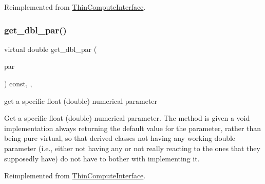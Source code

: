 Reimplemented from \mbox{\hyperlink{class_s_m_spp__di__unipi__it_1_1_thin_compute_interface_adaa8da125823294995410c022a59a4b5}{Thin\+Compute\+Interface}}.

\mbox{\label{class_s_m_spp__di__unipi__it_1_1_f_real_objective_af7101b9f3e872b6ad9129ab99cff4cb7}} 
\subsubsection{\texorpdfstring{get\+\_\+dbl\+\_\+par()}{get\_dbl\_par()}}
{\footnotesize\ttfamily virtual double get\+\_\+dbl\+\_\+par (\begin{DoxyParamCaption}\item[{const \mbox{\hyperlink{class_s_m_spp__di__unipi__it_1_1_thin_compute_interface_aa3d710629ad8c434286726ad810c3b47}{idx\+\_\+type}}}]{par }\end{DoxyParamCaption}) const\hspace{0.3cm}{\ttfamily [inline]}, {\ttfamily [override]}, {\ttfamily [virtual]}}



get a specific float (double) numerical parameter 

Get a specific float (double) numerical parameter. The method is given a void implementation always returning the default value for the parameter, rather than being pure virtual, so that derived classes not having any working double parameter (i.\+e., either not having any or not really reacting to the ones that they supposedly have) do not have to bother with implementing it. 

Reimplemented from \mbox{\hyperlink{class_s_m_spp__di__unipi__it_1_1_thin_compute_interface_a16a600de08446b386bc437d8448ef44a}{Thin\+Compute\+Interface}}.

\mbox{\label{class_s_m_spp__di__unipi__it_1_1_f_real_objective_a465a771c115acf8d5f4e32e22f003014}} 
